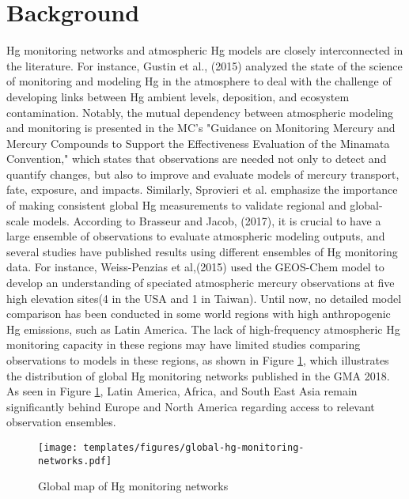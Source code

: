\section{Background}
\begin{flushleft}

Hg monitoring networks and atmospheric Hg models are closely interconnected in the literature. For instance, Gustin et al., (2015) analyzed the state of the science of monitoring and modeling Hg in the atmosphere to deal with the challenge of developing links between Hg ambient levels, deposition, and ecosystem contamination. Notably, the mutual dependency between atmospheric modeling and monitoring is presented in the MC's "Guidance on Monitoring Mercury and Mercury Compounds to Support the Effectiveness Evaluation of the Minamata Convention," which states that observations are needed not only to detect and quantify changes, but also to improve and evaluate models of mercury transport, fate, exposure, and impacts\cite{unep_guidance_2021}. Similarly, Sprovieri et al. emphasize the importance of making consistent global Hg measurements to validate regional and global-scale models\cite{sprovieri_atmospheric_2016}.  According to Brasseur and Jacob, (2017), it is crucial to have a large ensemble of observations to evaluate atmospheric modeling outputs, and several studies have published results using different ensembles of Hg monitoring data. For instance, Weiss-Penzias et al,(2015) used the GEOS-Chem model to develop an understanding of speciated atmospheric mercury observations at five high elevation sites(4 in the USA and 1 in Taiwan)\cite{weiss-penzias_use_2015}. Until now, no detailed model comparison has been conducted in some world regions with high anthropogenic Hg emissions, such as Latin America. The lack of high-frequency atmospheric Hg monitoring capacity in these regions may have limited studies comparing observations to models in these regions, as shown in Figure \ref{fig:global-hg-monitoring-networks}, which illustrates the distribution of global Hg monitoring networks published in the GMA 2018. As seen in Figure \ref{fig:global-hg-monitoring-networks}, Latin America, Africa, and South East Asia remain significantly behind Europe and North America regarding access to relevant observation ensembles. 
\end{flushleft}

\begin{figure}[H]
  \texttt{[image: templates/figures/global-hg-monitoring-networks.pdf]}
  \caption{Global map of Hg monitoring networks \cite{united_nations_environment_programme_technical_2019}}
  \label{fig:global-hg-monitoring-networks}
  \centering
  
\end{figure}
\FloatBarrier

